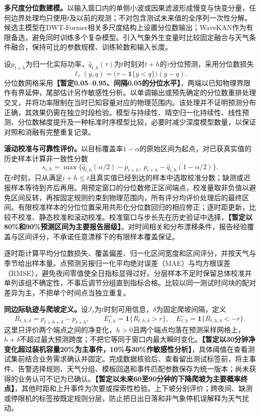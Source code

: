 \textbf{多尺度分位数建模。}以输入窗口内的单侧小波或因果滤波形成慢变与快变分量，任何边界处理均只使用$t$及以前的观测；不对包含测试未来值的全序列一次性分解。候选主模型在DWT-Former相关多尺度结构上设置分位数输出；WaveKAN作为有限备选，避免同时训练多个复杂模型。引入气象外生变量时比较固定融合与天气条件融合，保持可比的参数规模、训练轮数和输入长度。

设$p_{t+h}$为归一化实际功率，$\widehat q_{t,h}(\tau)$为$t$时刻对$t+h$的$\tau$分位预测，采用分位数损失
\[
\ell_\tau(y,q)=\bigl(\tau-\mathbf{1}\{y<q\}\bigr)(y-q).
\]
分位数网格采用\textbf{【暂定0.05--0.95、间隔0.05的分位水平】}，两端以已知物理界限作有界延伸，尾部估计另作敏感性分析。以单调输出或预先确定的分位数重排处理交叉，并将功率限制在当时已知容量对应的物理范围内。该处理并不证明预测分布正确，其效果仍需在独立时段检验。模型与持续性、晴空归一化持续性、线性预测、分位数梯度提升及一种标准时序模型比较，必要时减少深度模型数量，以保证对照和消融有完整重复记录。

\textbf{滚动校准与可靠性评价。}以目标覆盖率$1-\alpha$的原始区间为起点，对已获真实值的历史样本计算非一致性分数
\[
s_{i,h}=\max\{\widehat q_{i,h}(\alpha/2)-p_{i+h},\ p_{i+h}-\widehat q_{i,h}(1-\alpha/2)\}.
\]
在$t$时刻，只从满足$i+h\leq t$且真实值已经到达的样本中选取校准分数；缺测或迟报样本等待到齐后再用。用预定窗口的分位数修正区间端点，校准量取非负值以避免区间反转，再按固定规则约束到物理范围内，所有评分均评价处理后的最终区间。有限校准样本的分位位置采用共形化分位数回归的相应修正\cite{romano2019cqr}；逐时距更新，比较不校准、静态校准和滚动校准。校准窗口与步长先在历史验证中选择，\textbf{【暂定以80\%和90\%预测区间为主要报告层级】}。对时间相关和分布漂移条件，报告经验覆盖与区间评分，不承诺任意漂移下的有限样本覆盖保证。

逐时距计算平均分位数损失、覆盖偏差、归一化区间宽度和区间评分，并按天气与季节给出样本量。点预测另报归一化平均绝对误差（MAE）与均方根误差（RMSE），避免夜间零值使全日指标显得过好。分层样本不足时保留总体校准并单列该组不确定性，不事后调节分组直到指标合格。比较以同一测试时间块的配对差异为主，不把单个时间点当独立重复。

\textbf{同边际轨迹与爬坡定义。}设$\mathcal I_t$为$t$时刻可用信息，$\delta$为固定爬坡间隔，定义
\[
R_{t,h,\delta}=p_{t+h+\delta}-p_{t+h},\qquad
E^+_{t,h}=\mathbf{1}\{R_{t,h,\delta}>r\},\quad
E^-_{t,h}=\mathbf{1}\{R_{t,h,\delta}<-r\}.
\]
这里只评价两个端点之间的净变化，$h>0$且两个端点均落在预测采样网格上，$h+\delta$不超过最大预测跨度；不把它等同于窗口内最大瞬时变化。\textbf{【暂定以30分钟净变化超过装机容量20\%为主事件，10\%与30\%作敏感性分析】}，具体阈值在查看测试集前结合业务需求确认并固定。完成数据核验后、查看留出测试标签前，将主事件、告警选择规则、天气分组、模板回退和事件匹配参数保存为统一版本；尚未获得的业务认可不记为已确认。\textbf{【暂定以未来60至90分钟的下降爬坡为主要概率终点】}，其他时距和上升事件为次要或探索性检验。上下坡分别评价；跨夜间、缺测或停限机的标签按既定规则分层，防止把日出日落和非气象停机误解释为天气扰动。

